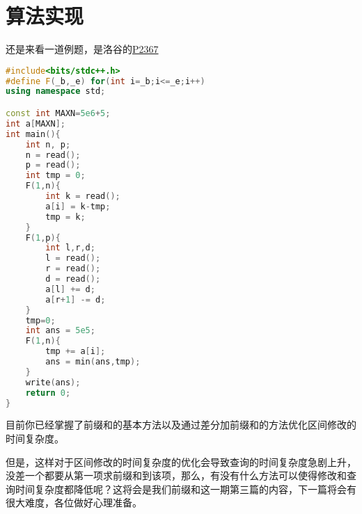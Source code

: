 \section{算法实现}
还是来看一道例题，是洛谷的\href{https://www.luogu.com.cn/problem/P2367}{P2367}\par
\begin{lstlisting}[language=cpp]
#include<bits/stdc++.h>
#define F(_b,_e) for(int i=_b;i<=_e;i++)
using namespace std;

const int MAXN=5e6+5;
int a[MAXN];
int main(){
    int n, p;
    n = read();
    p = read();
    int tmp = 0;
    F(1,n){
        int k = read();
        a[i] = k-tmp;
        tmp = k;
    }
    F(1,p){
        int l,r,d;
        l = read();
        r = read();
        d = read();
        a[l] += d;
        a[r+1] -= d;
    }
    tmp=0;
    int ans = 5e5;
    F(1,n){
        tmp += a[i];
        ans = min(ans,tmp);
    }
    write(ans);
    return 0;
}
\end{lstlisting}
目前你已经掌握了前缀和的基本方法以及通过差分加前缀和的方法优化区间修改的时间复杂度。\par
但是，这样对于区间修改的时间复杂度的优化会导致查询的时间复杂度急剧上升，没差一个都要从第一项求前缀和到该项，那么，有没有什么方法可以使得修改和查询时间复杂度都降低呢？这将会是我们前缀和这一期第三篇的内容，下一篇将会有很大难度，各位做好心理准备。\par
